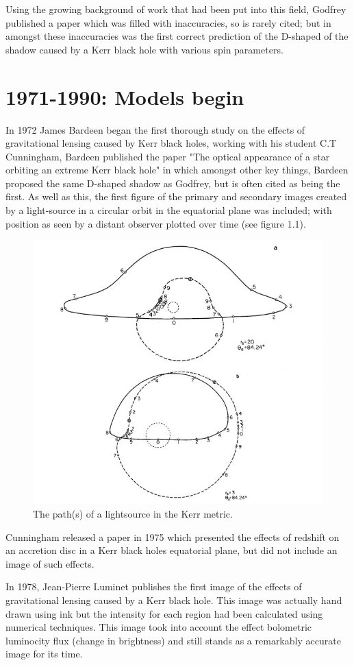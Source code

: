 \documentclass[oneside,openright,frontopenright, singlespacing]{dmathesis}
\begin{document}
\vspace{1em}
	Using the growing background of work that had been put into this field, Godfrey published a paper which was filled with inaccuracies, so is rarely cited; but in amongst these inaccuracies was the first correct prediction of the D-shaped of the shadow caused by a Kerr black hole with various spin parameters.

\section{1971-1990: Models begin}

	In 1972 James Bardeen began the first thorough study on the effects of gravitational lensing caused by Kerr black holes\cite{bardeen1973timelike}, working with his student C.T Cunningham, Bardeen published the paper "The optical appearance of a star orbiting an extreme Kerr black hole"\cite{cunningham1973optical} in which amongst other key things, Bardeen proposed the same D-shaped shadow as Godfrey, but is often cited as being the first. As well as this, the first figure of the primary and secondary images created by a light-source in a circular orbit in the equatorial plane was included; with position as seen by a distant observer plotted over time (see figure 1.1).

\begin{figure}[!ht]
	\centering
	\includegraphics[width=0.4\linewidth]{img/Cunningham-Bardeen-1973-2images-2}
	\caption{The path(s) of a lightsource in the Kerr metric. \cite{cunningham1973optical}}
\end{figure}

\vspace{1em}
	Cunningham released a paper in 1975 which presented the effects of redshift on an accretion disc in a Kerr black holes equatorial plane\cite{cunningham1975effects}, but did not include an image of such effects.

\vspace{1em}
	In 1978, Jean-Pierre Luminet publishes the first image of the effects of gravitational lensing caused by a Kerr black hole\cite{luminet1979image}. This image was actually hand drawn using ink but the intensity for each region had been calculated using numerical techniques. This image took into account the effect bolometric luminocity flux (change in brightness) and still stands as a remarkably accurate image for its time.
\end{document}
